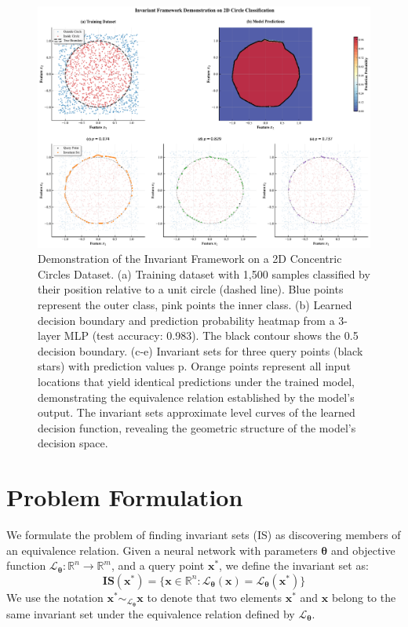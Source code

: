 \documentclass[licencjacka,en]{pracamgr}
\begin{document}
\begin{figure}[h]
\centering
\includegraphics[width=\linewidth]{figures/main/invariant_framework_combined.pdf}
\caption{Demonstration of the Invariant Framework on a 2D Concentric Circles Dataset.
(a) Training dataset with 1,500 samples classified by their position relative to a unit circle (dashed line). Blue points represent the outer class, pink points the inner class.
(b) Learned decision boundary and prediction probability heatmap from a 3-layer MLP (test accuracy: 0.983). The black contour shows the 0.5 decision boundary.
(c-e) Invariant sets for three query points (black stars) with prediction values p. Orange points represent all input locations that yield identical predictions under the trained model, demonstrating the equivalence relation established by the model's output. The invariant sets approximate level curves of the learned decision function, revealing the geometric structure of the model's decision space.}
\label{fig:teaser}
\end{figure}

\section{Problem Formulation}
We formulate the problem of finding invariant sets (IS) as discovering members of an equivalence relation. Given a neural network with parameters $\boldsymbol{\theta}$ and objective function $\mathcal{L}_{\boldsymbol{\theta}}:\mathbb{R}^n \rightarrow \mathbb{R}^m$, and a query point $\mathbf{x^*}$, we define the invariant set as:
\begin{equation}
  \mathbf{IS}(\mathbf{x^*}) = \{ \mathbf{x} \in \mathbb{R}^n : \mathcal{L}_{\boldsymbol{\theta}}(\mathbf{x}) = \mathcal{L}_{\boldsymbol{\theta}}(\mathbf{x^*}) \}
  \label{eq:is}
\end{equation}
We use the notation $\mathbf{x^*} \sim_{\mathcal{L}_{\boldsymbol{\theta}}} \mathbf{x}$ to denote that two elements $\mathbf{x^*}$ and $\mathbf{x}$ belong to the same invariant set under the equivalence relation defined by $\mathcal{L}_{\boldsymbol{\theta}}$.
\end{document}
